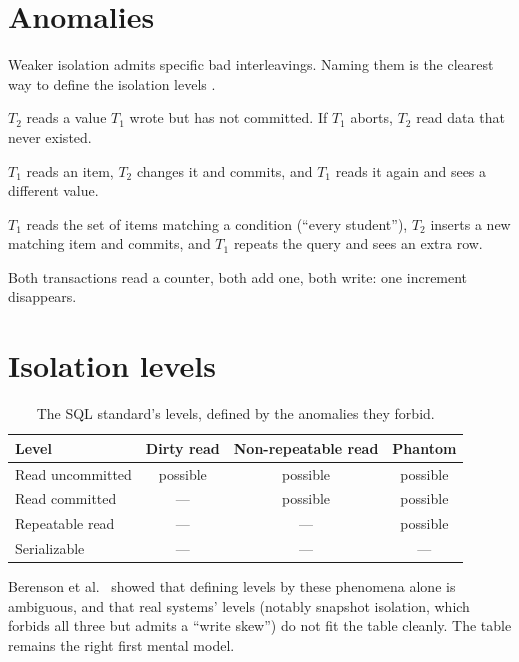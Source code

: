 \section{Anomalies}

Weaker isolation admits specific bad interleavings. Naming them is the clearest
way to define the isolation levels \cite{berenson}.

\begin{description}[leftmargin=1.2em]
\item[Dirty read.] $T_2$ reads a value $T_1$ wrote but has not committed. If $T_1$ aborts, $T_2$ read data that never existed.
\item[Non-repeatable read.] $T_1$ reads an item, $T_2$ changes it and commits, and $T_1$ reads it again and sees a different value.
\item[Phantom.] $T_1$ reads the set of items matching a condition (``every student''), $T_2$ inserts a new matching item and commits, and $T_1$ repeats the query and sees an extra row.
\item[Lost update.] Both transactions read a counter, both add one, both write: one increment disappears.
\end{description}

\section{Isolation levels}

\begin{table}[ht]
\centering
\begin{tabular}{@{}lccc@{}}
\toprule
Level & Dirty read & Non-repeatable read & Phantom \\
\midrule
Read uncommitted & possible & possible & possible \\
Read committed & --- & possible & possible \\
Repeatable read & --- & --- & possible \\
Serializable & --- & --- & --- \\
\bottomrule
\end{tabular}
\caption{The SQL standard's levels, defined by the anomalies they forbid.}
\label{tab:isolation}
\end{table}

Berenson et al.\ \cite{berenson} showed that defining levels by these phenomena
alone is ambiguous, and that real systems' levels (notably snapshot isolation,
which forbids all three but admits a ``write skew'') do not fit the table
cleanly. The table remains the right first mental model.

